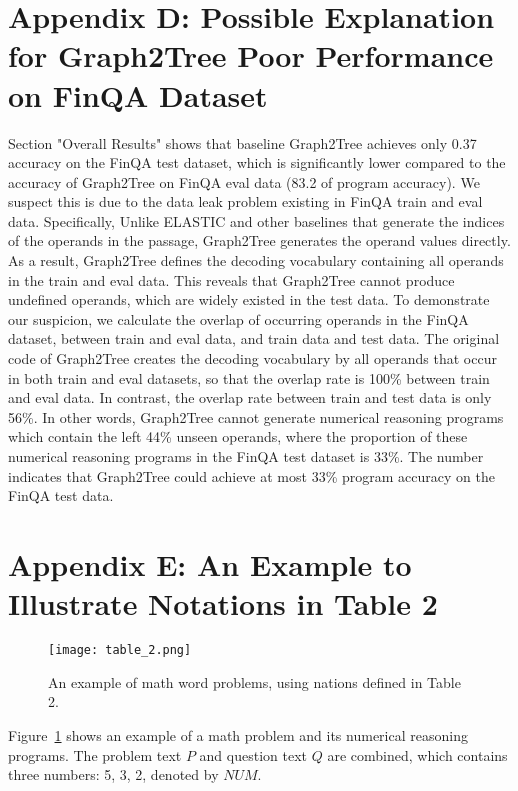 \documentclass{article}
\begin{document}
\section*{Appendix D: Possible Explanation for Graph2Tree Poor Performance on FinQA Dataset}
\label{appendix:d}

Section "Overall Results" shows that baseline Graph2Tree achieves only 0.37 accuracy on the FinQA test dataset, which is significantly lower compared to the accuracy of Graph2Tree on FinQA eval data (83.2 of program accuracy). We suspect this is due to the data leak problem existing in FinQA train and eval data. Specifically, Unlike ELASTIC and other baselines that generate the indices of the operands in the passage, Graph2Tree generates the operand values directly. As a result, Graph2Tree defines the decoding vocabulary containing all operands in the train and eval data. This reveals that Graph2Tree cannot produce undefined operands, which are widely existed in the test data. To demonstrate our suspicion, we calculate the overlap of occurring operands in the FinQA dataset, between train and eval data, and train data and test data. The original code of Graph2Tree creates the decoding vocabulary by all operands that occur in both train and eval datasets, so that the overlap rate is 100\% between train and eval data. In contrast, the overlap rate between train and test data is only 56\%. In other words, Graph2Tree cannot generate numerical reasoning programs which contain the left 44\% unseen operands, where the proportion of these numerical reasoning programs in the FinQA test dataset is 33\%. The number indicates that Graph2Tree could achieve at most 33\% program accuracy on the FinQA test data. 



\section*{Appendix E: An Example to Illustrate Notations in Table 2}
\label{appendix:e}

\begin{figure}[tbhp!] 
\centering 
\texttt{[image: table\_2.png]} 
\caption{An example of math word problems, using nations defined in Table 2.} 
\label{fig:table_2}
\end{figure}

Figure~\ref{fig:table_2} shows an example of a math problem and its numerical reasoning programs. The problem text \(P\) and question text \(Q\) are combined, which contains three numbers: 5, 3, 2, denoted by \(\textit{NUM}\).
\end{document}
